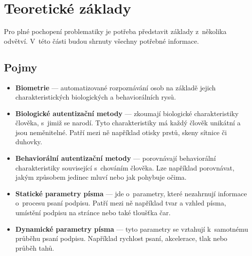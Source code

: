 

\chapter{Teoretické základy}
Pro plné pochopení problematiky je potřeba představit základy z~několika odvětví. 
V~této části budou shrnuty všechny potřebné informace. 

\section{Pojmy}\label{sec:pojmy}
\begin{itemize}
  \item \textbf{Biometrie} --- automatizované rozpoznávání osob na základě jejich charakteristických biologických a behaviorálních rysů. %
  \item \textbf{Biologické autentizační metody} --- zkoumají biologické charakteristiky člověka, s~jimiž se narodí. Tyto charakteristiky má každý člověk unikátní a jsou neměnitelné. Patří mezi ně například otisky prstů, skeny sítnice či duhovky.  
  \item \textbf{Behaviorální autentizační metody} --- porovnávají behaviorální charakteristiky související s~chováním člověka. Lze například porovnávat, jakým způsobem jedinec mluví nebo jak pohybuje očima.
  \item \textbf{Statické parametry písma} --- jde o~parametry, které nezahrnují informace o~procesu psaní podpisu. Patří mezi ně například tvar a vzhled písma, umístění podpisu na stránce nebo také tloušťka čar.
  \item \textbf{Dynamické parametry písma} --- tyto parametry se vztahují k~samotnému průběhu psaní podpisu. Například rychlost psaní, akcelerace, tlak nebo průběh tahů.
\end{itemize}

